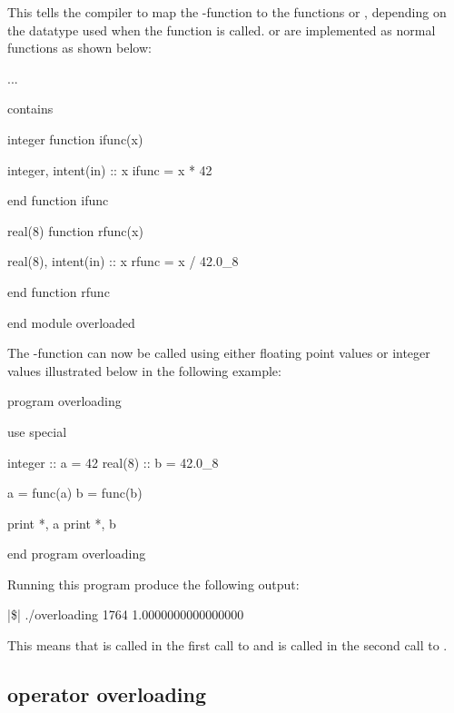 This tells the compiler to map the -function to the functions  or , depending on the datatype used when the function is called.  or  are implemented as normal functions as shown below:

\begin{fortrancodeenv}
	...
	
contains

integer function ifunc(x)
	
	integer, intent(in) :: x
	ifunc = x * 42
	
end function ifunc

real(8) function rfunc(x)
	
	real(8), intent(in) :: x
	rfunc = x / 42.0_8
	
end function rfunc

end module overloaded
\end{fortrancodeenv}

The -function can now be called using either floating point values or integer values illustrated below in the following example:

\begin{fortrancodeenv}
program overloading

	use special
	
	integer :: a = 42
	real(8) :: b = 42.0_8
	
	a = func(a)
	b = func(b)
	
	print *, a
	print *, b
	
end program overloading
\end{fortrancodeenv}

Running this program produce the following output:

\cmdmode

\begin{fortrancodeenv}
|\$| ./overloading
        1764
   1.0000000000000000
\end{fortrancodeenv}

\fmode

This means that  is called in the first call to  and  is called in the second call to .

\subsection{operator overloading}

